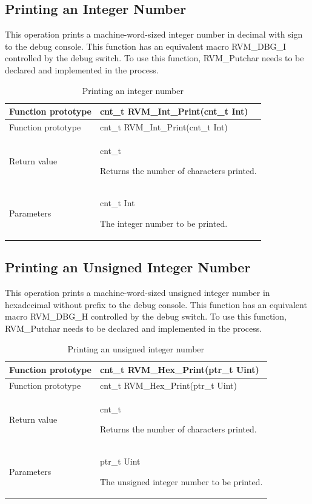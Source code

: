\subsection{Printing an Integer Number}\label{subsec:3-6-6}

This operation prints a machine-word-sized integer number in decimal with sign to the debug console. This function has an equivalent macro RVM\_DBG\_I controlled by the debug switch. To use this function, RVM\_Putchar needs to be declared and implemented in the process.

\begin{xltabular}{\textwidth}{@{}>{\hsize\raggedright\arraybackslash}X>{\hsize\raggedright\arraybackslash}X@{}}
\caption{Printing an integer number}\label{tab:3-19}\\
\toprule
Function prototype & cnt\_\allowbreak{}t RVM\_\allowbreak{}Int\_\allowbreak{}Print(cnt\_\allowbreak{}t Int)\tabularnewline
\endfirsthead
\toprule
Function prototype & cnt\_\allowbreak{}t RVM\_\allowbreak{}Int\_\allowbreak{}Print(cnt\_\allowbreak{}t Int)\tabularnewline
\midrule
\endhead
\bottomrule
\endlastfoot
Return value\strut
 & cnt\_\allowbreak{}t

Returns the number of characters printed.\strut
\tabularnewline
Parameters\strut
 & cnt\_\allowbreak{}t Int

The integer number to be printed.\strut
\tabularnewline
\end{xltabular}

\subsection{Printing an Unsigned Integer Number}\label{subsec:3-6-7}

This operation prints a machine-word-sized unsigned integer number in hexadecimal without prefix to the debug console. This function has an equivalent macro RVM\_DBG\_H controlled by the debug switch. To use this function, RVM\_Putchar needs to be declared and implemented in the process.

\begin{xltabular}{\textwidth}{@{}>{\hsize\raggedright\arraybackslash}X>{\hsize\raggedright\arraybackslash}X@{}}
\caption{Printing an unsigned integer number}\label{tab:3-20}\\
\toprule
Function prototype & cnt\_\allowbreak{}t RVM\_\allowbreak{}Hex\_\allowbreak{}Print(ptr\_\allowbreak{}t Uint)\tabularnewline
\endfirsthead
\toprule
Function prototype & cnt\_\allowbreak{}t RVM\_\allowbreak{}Hex\_\allowbreak{}Print(ptr\_\allowbreak{}t Uint)\tabularnewline
\midrule
\endhead
\bottomrule
\endlastfoot
Return value\strut
 & cnt\_\allowbreak{}t

Returns the number of characters printed.\strut
\tabularnewline
Parameters\strut
 & ptr\_\allowbreak{}t Uint

The unsigned integer number to be printed.\strut
\tabularnewline
\end{xltabular}

